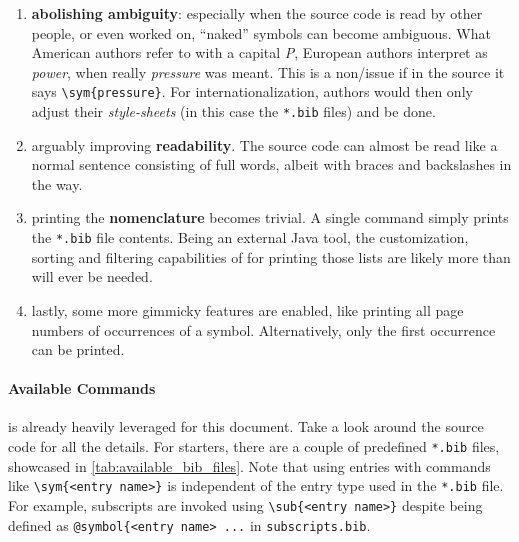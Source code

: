 \begin{enumerate}
        Yet, what is \emph{meant} is \emph{emphasis}; italic text is just what it
        happens to look like now, but it is not the \emph{meaning}.
        For example, we could later decide to redefine emphasized text to bold,
        or colored.
        If you previously did not differentiate strictly enough between
        \verb|\emph| and \verb|\textit|, you are in for a bad time.
        This is a trap beginners unfortunately often fall into.
        Using , abstracted markup\-/commands can be
        taken to a whole next level, leveraging this core \LaTeX{} strength.
    \item \textbf{abolishing ambiguity}:
        especially when the source code is read by other people, or even worked on,
        \enquote{naked} symbols can become ambiguous.
        What American authors refer to with a capital \emph{P}, European authors
        interpret as \emph{power}, when really \emph{pressure} was meant.
        This is a non\-/issue if in the source it says \verb|\sym{pressure}|.
        For internationalization, authors would then only adjust their
        \emph{style-sheets} (in this case the \texttt{*.bib} files) and be done.
    \item arguably improving \textbf{readability}.
        The source code can almost be read like a normal sentence consisting of full
        words, albeit with braces and backslashes in the way.
    \item printing the \textbf{nomenclature} becomes trivial.
        A single command simply prints the \texttt{*.bib} file contents.
        Being an external Java tool, the customization, sorting and filtering
        capabilities of  for printing those lists are likely
        more than will ever be needed.
    \item lastly, some more gimmicky features are enabled, like printing all
        page numbers of occurrences of a symbol.
        Alternatively, only the first occurrence can be printed.
\end{enumerate}

\paragraph{Available Commands}
 is already heavily leveraged for this document.
Take a look around the source code for all the details.
For starters, there are a couple of predefined \texttt{*.bib} files, showcased in
\cref{tab:available_bib_files}.
Note that using entries with commands like \verb|\sym{<entry name>}| is independent
of the entry type used in the \texttt{*.bib} file.
For example, subscripts are invoked using \verb|\sub{<entry name>}| despite being
defined as \verb|@symbol{<entry name> ...| in \texttt{subscripts.bib}.

